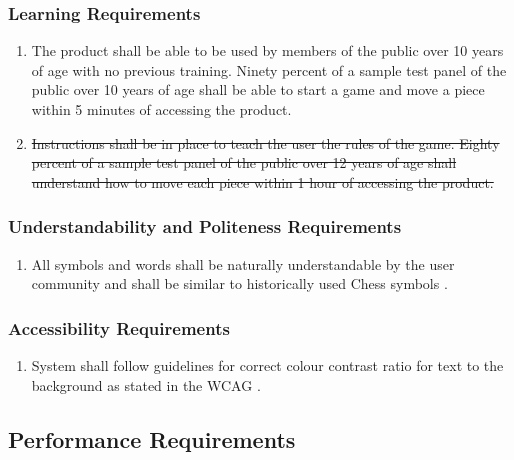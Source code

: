 \documentclass[12pt, titlepage]{article}
\begin{document}
    \subsubsection{Learning Requirements}
    \begin{enumerate}[{UH}1., leftmargin=2\parindent, resume]
    	\item The product shall be able to be used by members of the public over 10 years of age with no previous training.
    	Ninety percent of a sample test panel of the public over 10 years of age shall be able to start a game and move a piece within 5 minutes of accessing the product.
    	\item \sout{Instructions shall be in place to teach the user the rules of the game. Eighty percent of a sample test panel of the public over 12 years of age shall understand how to move each piece within 1 hour of accessing the product.}
    \end{enumerate}
    
    \subsubsection{Understandability and Politeness Requirements}
    \begin{enumerate}[{UH}1., leftmargin=2\parindent, resume]
    	\item All symbols and words shall be naturally understandable by the user community and shall be similar to historically used Chess symbols \cite{ChessHistory}. 
    \end{enumerate}
    
    \subsubsection{Accessibility Requirements}
    \begin{enumerate}[{UH}1., leftmargin=2\parindent, resume]
    	\item System shall follow guidelines for correct colour contrast ratio for text to the background as stated in the WCAG \cite{WCAG}.
    \end{enumerate}
    
    \subsection{Performance Requirements}
    
\end{document}
